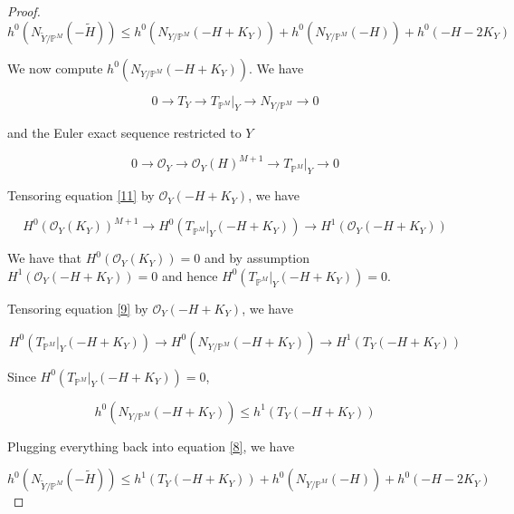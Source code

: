 \documentclass[11pt,twoside]{amsart}
\theoremstyle{plain}
\numberwithin{equation}{section}
\theoremstyle{definition}
\begin{document}
\begin{proof}
\begin{equation}\label{8}
h^0(N_{\widetilde{Y}/\mathbb{P}^M}(-\widetilde{H})) \leq  h^0(N_{Y/\mathbb{P}^M}(-H+K_Y)) + h^0(N_{Y/\mathbb{P}^M}(-H)) + h^0(-H-2K_Y)
\end{equation}

We now compute $h^0(N_{Y/\mathbb{P}^M}(-H+K_Y))$. 
We have

\begin{equation}\label{9}
   0 \to T_Y \to T_{\mathbb{P}^M}|_Y \to N_{Y/\mathbb{P}^M} \to 0 
\end{equation}




and the Euler exact sequence restricted to $Y$

\begin{equation}\label{11}
   0 \to \mathcal{O}_Y \to \mathcal{O}_Y(H)^{M+1} \to T_{\mathbb{P}^M}|_Y \to 0 
\end{equation}





Tensoring equation \ref{11} by $\mathcal{O}_Y(-H+K_Y)$, we have 

\begin{equation*}
     H^0(\mathcal{O}_Y(K_Y))^{M+1} \to H^0(T_{\mathbb{P}^M}|_Y(-H+K_Y)) \to H^1(\mathcal{O}_Y(-H+K_Y)) 
\end{equation*}

We have that $H^0(\mathcal{O}_Y(K_Y)) = 0$ and by assumption $H^1(\mathcal{O}_Y(-H+K_Y)) = 0$ and hence $H^0(T_{\mathbb{P}^M}|_Y(-H+K_Y)) = 0$. 




Tensoring equation \ref{9} by $\mathcal{O}_Y(-H+K_Y)$, we have 

\begin{equation*}
    H^0(T_{\mathbb{P}^M}|_Y(-H+K_Y)) \to H^0(N_{Y/\mathbb{P}^M}(-H+K_Y)) \to H^1(T_Y(-H+K_Y))
\end{equation*}

Since $H^0(T_{\mathbb{P}^M}|_Y(-H+K_Y)) = 0$, 

\begin{equation}\label{14}
    h^0(N_{Y/\mathbb{P}^M}(-H+K_Y)) \leq h^1(T_Y(-H+K_Y))
\end{equation}

Plugging everything back into equation \ref{8}, we have

\begin{equation}\label{15}
h^0(N_{\widetilde{Y}/\mathbb{P}^M}(-\widetilde{H})) \leq  h^1(T_Y(-H+K_Y)) + h^0(N_{Y/\mathbb{P}^M}(-H)) + h^0(-H-2K_Y)
\end{equation}



\end{proof}
\end{document}
